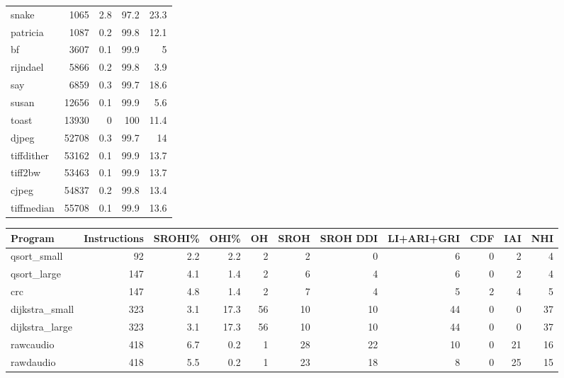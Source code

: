 \begin{tabular}{lrrrr}
 snake           &    1065 &    2.8 &         97.2 &    23.3 \\
 patricia        &    1087 &    0.2 &         99.8 &    12.1 \\
 bf              &    3607 &    0.1 &         99.9 &     5   \\
 rijndael        &    5866 &    0.2 &         99.8 &     3.9 \\
 say             &    6859 &    0.3 &         99.7 &    18.6 \\
 susan           &   12656 &    0.1 &         99.9 &     5.6 \\
 toast           &   13930 &    0   &        100   &    11.4 \\
 djpeg           &   52708 &    0.3 &         99.7 &    14   \\
 tiffdither      &   53162 &    0.1 &         99.9 &    13.7 \\
 tiff2bw         &   53463 &    0.1 &         99.9 &    13.7 \\
 cjpeg           &   54837 &    0.2 &         99.8 &    13.4 \\
 tiffmedian      &   55708 &    0.1 &         99.9 &    13.6 \\
\hline
\end{tabular}\begin{tabular}{lrrrrrrrrrr}
\hline
 Program         &   Instructions &   SROHI\% &   OHI\% &   OH &   SROH &   SROH DDI &   LI+ARI+GRI &   CDF &   IAI &   NHI \\
\hline
 qsort\_small     &             92 &      2.2 &    2.2 &    2 &      2 &          0 &            6 &     0 &     2 &     4 \\
 qsort\_large     &            147 &      4.1 &    1.4 &    2 &      6 &          4 &            6 &     0 &     2 &     4 \\
 crc             &            147 &      4.8 &    1.4 &    2 &      7 &          4 &            5 &     2 &     4 &     5 \\
 dijkstra\_small  &            323 &      3.1 &   17.3 &   56 &     10 &         10 &           44 &     0 &     0 &    37 \\
 dijkstra\_large  &            323 &      3.1 &   17.3 &   56 &     10 &         10 &           44 &     0 &     0 &    37 \\
 rawcaudio       &            418 &      6.7 &    0.2 &    1 &     28 &         22 &           10 &     0 &    21 &    16 \\
 rawdaudio       &            418 &      5.5 &    0.2 &    1 &     23 &         18 &            8 &     0 &    25 &    15 \\

\end{tabular}
